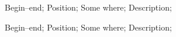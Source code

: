 \addwork%
{%
    Begin--end;%
    Position;%
    Some where;%
    Description;%
}%

\addwork%
{%
    Begin--end;%
    Position;%
    Some where;%
    Description;%
}%
